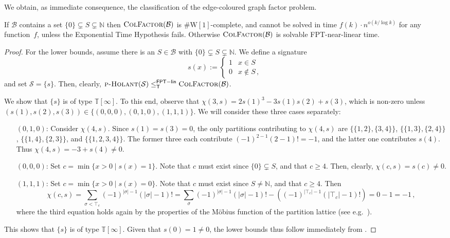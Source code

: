 \documentclass[authorcolumns,numberwithinsect]{no-lipics-v2022}
\newcommand{\W}{\mathrm{W}}
\newcommand{\fptlinred}{\leq^{\mathsf{FPT-lin}}_{\mathsf{T}}}
\begin{document}
We obtain, as immediate consequence, the classification of the edge-coloured graph factor problem.
\begin{corollary}\label{cor:factor_classification_col}
    If $\mathcal{B}$ contains a set $\{0\} \subsetneq S \subsetneq \mathbb{N}$ then $\textsc{ColFactor}(\mathcal{B})$ is $\#\W[1]$-complete, and cannot be solved in time $f(k)\cdot n^{o(k/\log k)}$ for any function~$f$, unless the Exponential Time Hypothesis fails. Otherwise $\textsc{ColFactor}(\mathcal{B})$ is solvable FPT-near-linear time.
\end{corollary}
\begin{proof}
    For the lower bounds, assume there is an $S\in \mathcal{B}$ with $\{0\} \subsetneq S \subsetneq \mathbb{N}$. We define a signature 
    \[s(x) := \begin{cases}
        1 & x \in S\\
        0 & x \notin S\,,
    \end{cases}\]
    and set $\mathcal{S}=\{s\}$. Then, clearly, $\textsc{p-Holant}(\mathcal{S})\fptlinred \textsc{ColFactor}(\mathcal{B})$. 
    
    We show that $\{s\}$ is of type $\mathbb{T}[\infty]$. To this end, observe that $\chi(3,s)= 2s(1)^3 - 3s(1)s(2) + s(3)$, which is non-zero unless $(s(1),s(2),s(3))\in \{(0,0,0),(0,1,0),(1,1,1)\}$. We will consider these three cases separately:
\begin{itemize}[leftmargin=1.5cm]
    \item[$(0,1,0)$:] Consider $\chi(4,s)$. Since $s(1)=s(3)=0$, the only partitions contributing to $\chi(4,s)$ are $\{\{1,2\},\{3,4\}\}$, $\{\{1,3\},\{2,4\}\}$, $\{\{1,4\},\{2,3\}\}$, and $\{\{1,2,3,4\}\}$. The former three each contribute $(-1)^{2-1} (2-1)! = -1$, and the latter one contributes $s(4)$. Thus $\chi(4,s) = -3 +s(4)\neq 0$.
    \item[$(0,0,0)$:] Set $c=\min\{x>0 \mid s(x)= 1\}$. Note that $c$ must exist since $\{0\} \subsetneq S$, and that $c\geq 4$. Then, clearly, $\chi(c,s)= s(c)\neq 0$.
    \item[$(1,1,1)$:] Set $c=\min\{x>0 \mid s(x)= 0\}$. Note that $c$ must exist since $S\neq \mathbb{N}$, and that $c\geq 4$. Then
    \[\chi(c,s)= \sum_{\sigma < \top_c} (-1)^{|\sigma|-1} (|\sigma|-1)! = \sum_{\sigma} (-1)^{|\sigma|-1} (|\sigma|-1)! - \left((-1)^{|\top_c|-1} (|\top_c|-1)!\right) = 0 -1 = -1 \,,\]
    where the third equation holds again by the properties of the M\"obius function of the partition lattice (see e.g.\ \cite[Section 3.7]{Stanley11}).
\end{itemize}
This shows that $\{s\}$ is of type $\mathbb{T}[\infty]$. Given that $s(0)=1\neq 0$, the lower bounds thus follow immediately from .


\end{proof}
\end{document}
